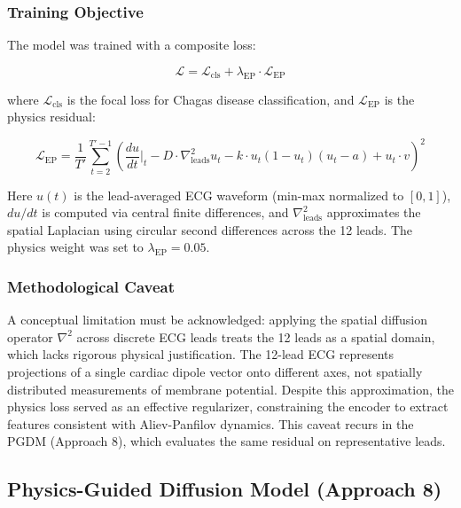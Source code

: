 \subsubsection{Training Objective}

The model was trained with a composite loss:

\begin{equation}
    \mathcal{L} = \mathcal{L}_{\text{cls}} + \lambda_{\text{EP}} \cdot \mathcal{L}_{\text{EP}}
\end{equation}

where $\mathcal{L}_{\text{cls}}$ is the focal loss for Chagas disease classification, and $\mathcal{L}_{\text{EP}}$ is the physics residual:

\begin{equation}
    \mathcal{L}_{\text{EP}} = \frac{1}{T'} \sum_{t=2}^{T'-1} \left( \frac{du}{dt}\bigg|_t - D \cdot \nabla^2_{\text{leads}} u_t - k \cdot u_t(1-u_t)(u_t - a) + u_t \cdot v \right)^2
\end{equation}

Here $u(t)$ is the lead-averaged ECG waveform (min-max normalized to $[0,1]$), $du/dt$ is computed via central finite differences, and $\nabla^2_{\text{leads}}$ approximates the spatial Laplacian using circular second differences across the 12 leads. The physics weight was set to $\lambda_{\text{EP}} = 0.05$.

\subsubsection{Methodological Caveat}

A conceptual limitation must be acknowledged: applying the spatial diffusion operator $\nabla^2$ across discrete ECG leads treats the 12 leads as a spatial domain, which lacks rigorous physical justification. The 12-lead ECG represents projections of a single cardiac dipole vector onto different axes, not spatially distributed measurements of membrane potential. Despite this approximation, the physics loss served as an effective regularizer, constraining the encoder to extract features consistent with Aliev-Panfilov dynamics. This caveat recurs in the PGDM (Approach 8), which evaluates the same residual on representative leads.

\subsection{Physics-Guided Diffusion Model (Approach 8)}
\label{sec:pgdm}

